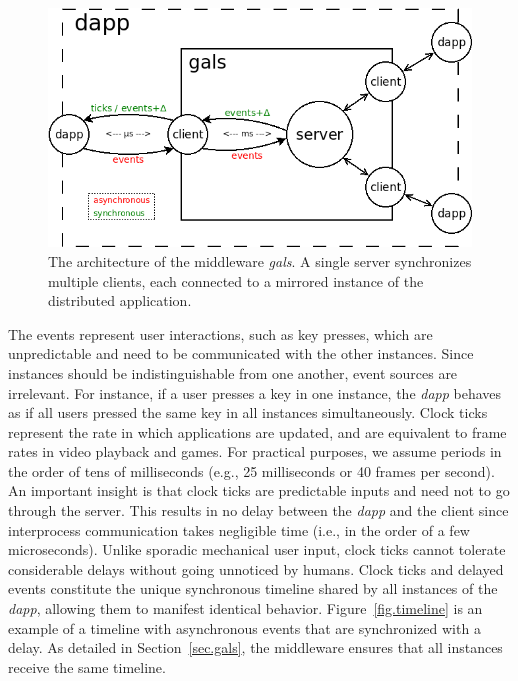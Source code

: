 \documentclass[sigplan,screen]{acmart}
\begin{document}
\begin{figure}[t]
  \centering
  \includegraphics[width=\linewidth]{middleware}
  \caption{
    \label{fig.middleware}
    The architecture of the middleware \emph{gals}.
    A single server synchronizes multiple clients, each connected to a mirrored
    instance of the distributed application.
  }
\end{figure}

The events represent user interactions, such as key presses, which are
unpredictable and need to be communicated with the other instances.
Since instances should be indistinguishable from one another, event sources are
irrelevant.
For instance, if a user presses a key in one instance, the \emph{dapp} behaves
as if all users pressed the same key in all instances simultaneously.
%
Clock ticks represent the rate in which applications are updated, and are
equivalent to frame rates in video playback and games.
For practical purposes, we assume periods in the order of tens of milliseconds
(e.g., 25 milliseconds or 40 frames per second).
An important insight is that clock ticks are predictable inputs and need not to
go through the server.
This results in no delay between the \emph{dapp} and the client since
interprocess communication takes negligible time (i.e., in the order of a few
microseconds).
Unlike sporadic mechanical user input, clock ticks cannot tolerate considerable
delays without going unnoticed by humans.
%
Clock ticks and delayed events constitute the unique synchronous timeline
shared by all instances of the \emph{dapp}, allowing them to manifest identical
behavior.
Figure~\ref{fig.timeline} is an example of a timeline with asynchronous events
that are synchronized with a delay.
As detailed in Section~\ref{sec.gals}, the middleware ensures that all
instances receive the same timeline.
\end{document}
